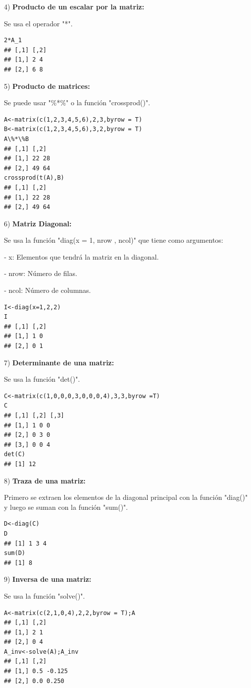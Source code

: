 \documentclass[12pt,letterpaper]{report} %
\begin{document}
4) \textbf{Producto de un escalar por la matriz:}

Se usa el operador "*".

\begin{lstlisting}
2*A_1
## [,1] [,2]
## [1,] 2 4
## [2,] 6 8
\end{lstlisting}

5) \textbf{Producto de matrices:}

Se puede usar  "\%*\%" o la función "crossprod()".

\begin{lstlisting}
A<-matrix(c(1,2,3,4,5,6),2,3,byrow = T)
B<-matrix(c(1,2,3,4,5,6),3,2,byrow = T)
A\%*\%B
## [,1] [,2]
## [1,] 22 28
## [2,] 49 64
crossprod(t(A),B)
## [,1] [,2]
## [1,] 22 28
## [2,] 49 64
\end{lstlisting}

6) \textbf{Matriz Diagonal:}

Se usa la función "diag(x = 1, nrow , ncol)" que tiene como argumentos:

‐ x: Elementos que tendrá la matriz en la diagonal.

‐ nrow: Número de filas.

‐ ncol: Número de columnas.

\begin{lstlisting}
I<-diag(x=1,2,2)
I
## [,1] [,2]
## [1,] 1 0
## [2,] 0 1
\end{lstlisting}

7) \textbf{Determinante de una matriz:}

Se usa la función "det()".

\begin{lstlisting}
C<-matrix(c(1,0,0,0,3,0,0,0,4),3,3,byrow =T)
C
## [,1] [,2] [,3]
## [1,] 1 0 0
## [2,] 0 3 0
## [3,] 0 0 4
det(C)
## [1] 12
\end{lstlisting}

8) \textbf{Traza de una matriz:}

Primero  se extraen los elementos de la diagonal principal con la función "diag()" y luego se suman con la función "sum()".

\begin{lstlisting}
D<-diag(C)
D
## [1] 1 3 4
sum(D)
## [1] 8
\end{lstlisting}

9) \textbf{Inversa de una matriz:}

Se usa la función "solve()".

\begin{lstlisting}
A<-matrix(c(2,1,0,4),2,2,byrow = T);A
## [,1] [,2]
## [1,] 2 1
## [2,] 0 4
A_inv<-solve(A);A_inv
## [,1] [,2]
## [1,] 0.5 -0.125
## [2,] 0.0 0.250
\end{lstlisting}
\end{document}
